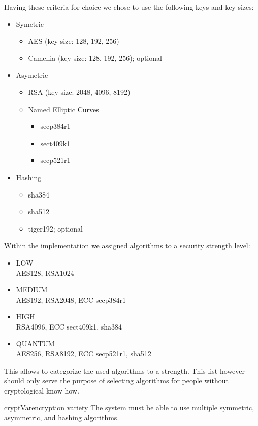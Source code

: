 Having these criteria for choice we chose to use the following keys and key sizes:
\begin{itemize}
	\item Symetric
	\begin{itemize}
		\item AES (key size: 128, 192, 256)
		\item Camellia (key size: 128, 192, 256); optional
	\end{itemize}
	\item Asymetric
	\begin{itemize}
		\item RSA (key size: 2048, 4096, 8192)
		\item Named Elliptic Curves
		\begin{itemize}
			\item secp384r1
			\item sect409k1
			\item secp521r1
		\end{itemize}
	\end{itemize}
	\item Hashing
	\begin{itemize}
		\item sha384
		\item sha512
		\item tiger192; optional
	\end{itemize}
\end{itemize}

Within the implementation we assigned algorithms to a security strength level:
\begin{itemize}
	\item LOW\\
	      AES128, RSA1024
	\item MEDIUM\\
	      AES192, RSA2048, ECC secp384r1
	\item HIGH\\
		  RSA4096, ECC sect409k1, sha384
	\item QUANTUM\\
	      AES256, RSA8192, ECC secp521r1, sha512
\end{itemize}
This allows to categorize the used algorithms to a strength. This list however should only serve the purpose of selecting algorithms for people without cryptological know how.

\begin{requirement}{cryptVar}{encryption variety}
	The system must be able to use multiple symmetric, asymmetric, and hashing algorithms. 
\end{requirement}

